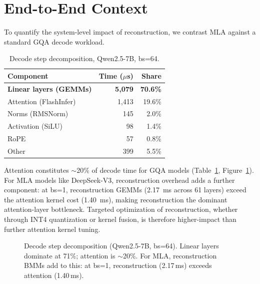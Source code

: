 \documentclass[10pt,twocolumn]{article}
\begin{document}
\section{End-to-End Context}
\label{sec:e2e}

To quantify the system-level impact of reconstruction, we contrast MLA against a standard GQA decode workload.

\begin{table}[h]
\centering
\small
\caption{Decode step decomposition, Qwen2.5-7B, bs=64.}
\label{tab:e2e}
\begin{tabular}{@{}lrr@{}}
\toprule
Component & Time ($\mu$s) & Share \\
\midrule
\textbf{Linear layers (GEMMs)} & \textbf{5,079} & \textbf{70.6\%} \\
Attention (FlashInfer) & 1,413 & 19.6\% \\
Norms (RMSNorm) & 145 & 2.0\% \\
Activation (SiLU) & 98 & 1.4\% \\
RoPE & 57 & 0.8\% \\
Other & 399 & 5.5\% \\
\bottomrule
\end{tabular}
\end{table}

Attention constitutes $\sim$20\% of decode time for GQA models (Table~\ref{tab:e2e}, Figure~\ref{fig:e2e}).  For MLA models like DeepSeek-V3, reconstruction overhead adds a further component: at bs=1, reconstruction GEMMs (2.17~ms across 61 layers) exceed the attention kernel cost (1.40~ms), making reconstruction the dominant attention-layer bottleneck.  Targeted optimization of reconstruction, whether through INT4 quantization or kernel fusion, is therefore higher-impact than further attention kernel tuning.

\begin{figure}[t]
\centering
{}
\caption{Decode step decomposition (Qwen2.5-7B, bs=64).  Linear layers dominate at 71\%; attention is ${\sim}$20\%.  For MLA, reconstruction BMMs add to this: at bs=1, reconstruction (2.17\,ms) exceeds attention (1.40\,ms).}
\label{fig:e2e}
\end{figure}
\end{document}
